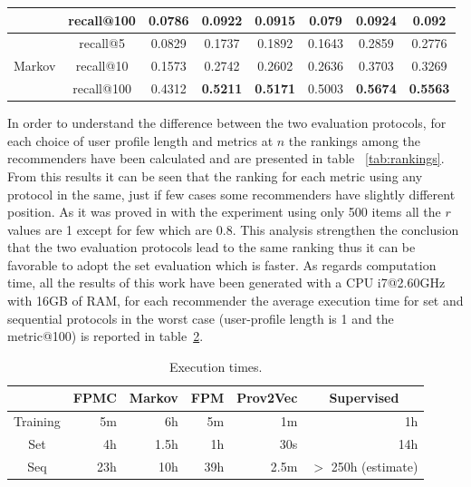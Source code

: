 \documentclass[prodmode,acmtecs]{acmsmall} %
\begin{document}
\begin{table}[htbp]
\begin{tabular}{|c|c|c|c|c|c|c|c|}
		\cmidrule{2-8}          & recall@100 & 0.0786 & 0.0922 & 0.0915 & 0.079 & 0.0924 & 0.092 \\
		\midrule
		\multirow{3}[6]{*}{Markov} & recall@5 & 0.0829 & 0.1737 & 0.1892 & 0.1643 & 0.2859 & 0.2776 \\
		\cmidrule{2-8}          & recall@10 & 0.1573 & 0.2742 & 0.2602 & 0.2636 & 0.3703 & 0.3269 \\
		\cmidrule{2-8}          & recall@100 & 0.4312 & \textbf{0.5211} & \textbf{0.5171} & 0.5003 & \textbf{0.5674} & \textbf{0.5563} \\
		\midrule
	\end{tabular}%
	\label{tab:recall5000}%
\end{table}%

In order to understand the difference between the two evaluation protocols, for each choice of user profile length and metrics at $n$ the rankings among the recommenders have been calculated and are presented in table ~\ref{tab:rankings}. From this results it can be seen that the ranking for each metric using any protocol in the same, just if few cases some recommenders have slightly different position. As it was proved in with the experiment using only 500 items all the $r$ values are 1 except for few which are 0.8. This analysis strengthen the conclusion that the two evaluation protocols lead to the same ranking thus it can be favorable to adopt the set evaluation which is faster. As regards computation time, all the results of this work have been generated with a CPU i7@2.60GHz with 16GB of RAM, for each recommender the average execution time for set and sequential protocols in the worst case (user-profile length is 1 and the metric@100) is reported in table~\ref{tab:time}.

\begin{table}[htbp]
	\centering
	\caption{Execution times.}
	\begin{tabular}{|c|r|r|r|r|r|}
		\toprule
		& \multicolumn{1}{c|}{FPMC} & \multicolumn{1}{c|}{Markov} & \multicolumn{1}{c|}{FPM} & \multicolumn{1}{c|}{Prov2Vec} & \multicolumn{1}{c|}{Supervised} \\
		\midrule
		Training & 5m    & 6h    & 5m    & 1m    & 1h \\
		\midrule
		Set   & 4h    & 1.5h  & 1h    & 30s   & 14h \\
		\midrule
		Seq   & 23h   & 10h   & 39h   & 2.5m  & $>$ 250h (estimate) \\
		
		\bottomrule
	\end{tabular}%
	\label{tab:time}%
\end{table}%
\end{document}
